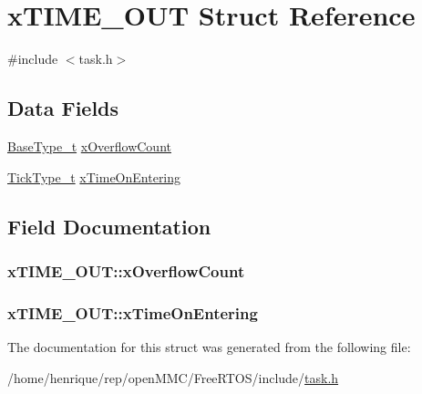 \hypertarget{structxTIME__OUT}{\section{x\-T\-I\-M\-E\-\_\-\-O\-U\-T Struct Reference}
\label{structxTIME__OUT}
}


{\ttfamily \#include $<$task.\-h$>$}

\subsection*{Data Fields}
\begin{DoxyCompactItemize}
\item 
\hyperlink{Flsh186_2prtmacro_8h_ac826f39420fcf5b32ba7123a1d243f99}{Base\-Type\-\_\-t} \hyperlink{structxTIME__OUT_a9289c6f97096a9b3e3fc705d0bc5a160}{x\-Overflow\-Count}
\item 
\hyperlink{Flsh186_2prtmacro_8h_aa69c48c6e902ce54f70886e6573c92a9}{Tick\-Type\-\_\-t} \hyperlink{structxTIME__OUT_a3464939ca050f7bcc6ffe0d8d3766337}{x\-Time\-On\-Entering}
\end{DoxyCompactItemize}


\subsection{Field Documentation}
\hypertarget{structxTIME__OUT_a9289c6f97096a9b3e3fc705d0bc5a160}{
\subsubsection[{x\-Overflow\-Count}]{ x\-T\-I\-M\-E\-\_\-\-O\-U\-T\-::x\-Overflow\-Count}}\label{structxTIME__OUT_a9289c6f97096a9b3e3fc705d0bc5a160}
\hypertarget{structxTIME__OUT_a3464939ca050f7bcc6ffe0d8d3766337}{
\subsubsection[{x\-Time\-On\-Entering}]{ x\-T\-I\-M\-E\-\_\-\-O\-U\-T\-::x\-Time\-On\-Entering}}\label{structxTIME__OUT_a3464939ca050f7bcc6ffe0d8d3766337}


The documentation for this struct was generated from the following file\-:\begin{DoxyCompactItemize}
\item 
/home/henrique/rep/open\-M\-M\-C/\-Free\-R\-T\-O\-S/include/\hyperlink{task_8h}{task.\-h}\end{DoxyCompactItemize}
